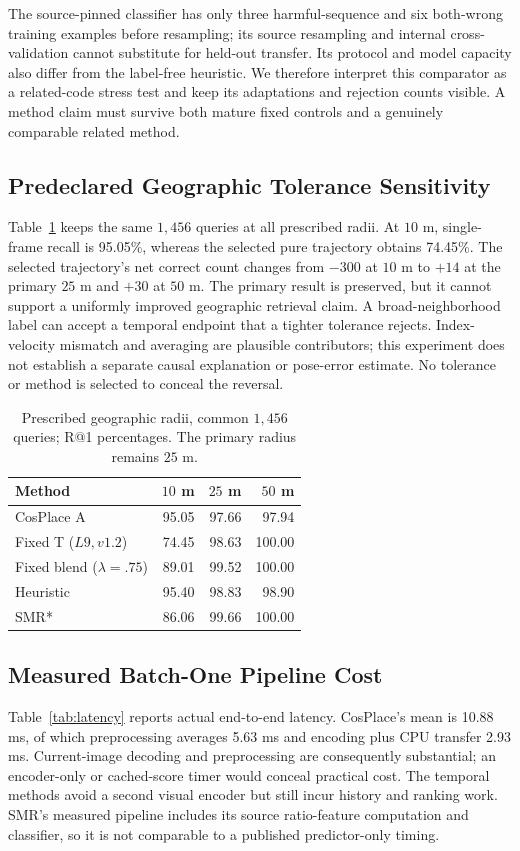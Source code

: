 \documentclass[conference]{IEEEtran}
\begin{document}
The source-pinned classifier has only three harmful-sequence and six both-wrong training examples before resampling; its source resampling and internal cross-validation cannot substitute for held-out transfer. Its protocol and model capacity also differ from the label-free heuristic. We therefore interpret this comparator as a related-code stress test and keep its adaptations and rejection counts visible. A method claim must survive both mature fixed controls and a genuinely comparable related method.

\subsection{Predeclared Geographic Tolerance Sensitivity}
Table~\ref{tab:radius} keeps the same $1,456$ queries at all prescribed radii. At $10$ m, single-frame recall is 95.05\%, whereas the selected pure trajectory obtains 74.45\%. The selected trajectory's net correct count changes from $-300$ at $10$ m to $+14$ at the primary $25$ m and $+30$ at $50$ m. The primary result is preserved, but it cannot support a uniformly improved geographic retrieval claim. A broad-neighborhood label can accept a temporal endpoint that a tighter tolerance rejects. Index-velocity mismatch and averaging are plausible contributors; this experiment does not establish a separate causal explanation or pose-error estimate. No tolerance or method is selected to conceal the reversal.
\begin{table}[t]\centering\small
\caption{Prescribed geographic radii, common $1,456$ queries; R@1 percentages. The primary radius remains $25$ m.}\label{tab:radius}
\begin{tabular}{lrrr}\toprule Method & $10$ m & $25$ m & $50$ m\\\midrule
CosPlace A & 95.05 & 97.66 & 97.94\\
Fixed T ($L9,v1.2$) & 74.45 & 98.63 & 100.00\\
Fixed blend ($\lambda=.75$) & 89.01 & 99.52 & 100.00\\
Heuristic & 95.40 & 98.83 & 98.90\\
SMR* & 86.06 & 99.66 & 100.00\\
\bottomrule\end{tabular}\end{table}

\subsection{Measured Batch-One Pipeline Cost}
Table~\ref{tab:latency} reports actual end-to-end latency. CosPlace's mean is 10.88 ms, of which preprocessing averages 5.63 ms and encoding plus CPU transfer 2.93 ms. Current-image decoding and preprocessing are consequently substantial; an encoder-only or cached-score timer would conceal practical cost. The temporal methods avoid a second visual encoder but still incur history and ranking work. SMR's measured pipeline includes its source ratio-feature computation and classifier, so it is not comparable to a published predictor-only timing.
\end{document}
